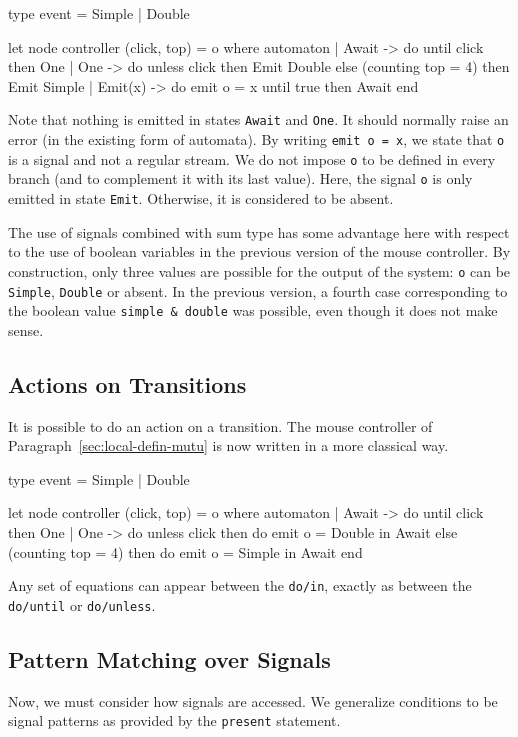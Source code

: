 \documentclass[11pt,titlepage,twoside]{report}
\begin{document}
\begin{runverbatim}[withresult]
type event = Simple | Double

let node controller (click, top) = o where
  automaton
  | Await ->
     do until click then One
  | One ->
     do unless click then Emit Double
        else (counting top = 4) then Emit Simple
  | Emit(x) ->
     do emit o = x
     until true then Await
  end
\end{runverbatim}
Note that nothing is emitted in states \verb-Await- and \verb-One-. It
should normally raise an error (in the existing form of automata). By
writing \verb-emit o = x-, we state that \verb-o- is a signal and not
a regular stream. We do not impose \verb-o- to be defined in every
branch (and to complement it with its last value). Here, the signal
\verb-o- is only emitted in state \verb-Emit-. Otherwise, it is
considered to be absent.

The use of signals combined with sum type has some advantage here with
respect to the use of boolean variables in the previous version of the
mouse controller. By construction, only three values are possible for
the output of the system: \verb-o- can be \verb-Simple-, \verb-Double-
or absent. In the previous version, a fourth case corresponding to the
boolean value \verb-simple & double- was possible, even though it does
not make sense.

\subsection{Actions on Transitions}

It is possible to do an action on a transition. The mouse controller of
Paragraph~\ref{sec:local-defin-mutu} is now
written in a more classical way.

\begin{runverbatim}[withresult]
type event = Simple | Double

let node controller (click, top) = o where
  automaton
  | Await ->
     do until click then One
  | One ->
     do unless click then do emit o = Double in Await
        else (counting top = 4) then do emit o = Simple in Await
  end
\end{runverbatim}
Any set of equations can appear between the \texttt{do/in}, exactly as
between the \texttt{do/until} or \texttt{do/unless}.

\subsection{Pattern Matching over Signals}
Now, we must consider how signals are accessed. We generalize
conditions to be signal patterns as provided by the \verb-present-
statement.
\end{document}
